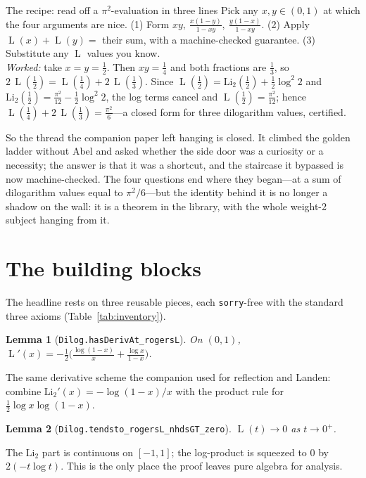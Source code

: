 \documentclass[11pt]{article}
\newtheorem{lemma}{Lemma}
\newcommand{\lean}[1]{\texttt{#1}}
\newcommand{\Li}{\mathrm{Li}_2}
\DeclareMathOperator{\Lrog}{L}
\begin{document}
\begin{recipebox}{The recipe: read off a $\pi^2$-evaluation in three lines}
Pick any $x,y\in(0,1)$ at which the four arguments are nice. (1) Form
$xy,\ \tfrac{x(1-y)}{1-xy},\ \tfrac{y(1-x)}{1-xy}$. (2) Apply
$\Lrog(x)+\Lrog(y)=$ their sum, with a machine-checked guarantee. (3) Substitute any
$\Lrog$ values you know.\\[3pt]
\emph{Worked:} take $x=y=\tfrac12$. Then $xy=\tfrac14$ and both fractions are $\tfrac13$,
so $2\,\Lrog(\tfrac12)=\Lrog(\tfrac14)+2\,\Lrog(\tfrac13)$. Since $\Lrog(\tfrac12)=
\Li(\tfrac12)+\tfrac12\log^2\!2$ and $\Li(\tfrac12)=\tfrac{\pi^2}{12}-\tfrac12\log^2\!2$,
the log terms cancel and $\Lrog(\tfrac12)=\tfrac{\pi^2}{12}$; hence
$\Lrog(\tfrac14)+2\,\Lrog(\tfrac13)=\tfrac{\pi^2}{6}$---a closed form for three dilogarithm
values, certified.
\end{recipebox}

So the thread the companion paper left hanging is closed. It climbed the golden ladder
without Abel and asked whether the side door was a curiosity or a necessity; the answer is
that it was a shortcut, and the staircase it bypassed is now machine-checked. The four
questions end where they began---at a sum of dilogarithm values equal to $\pi^2/6$---but the
identity behind it is no longer a shadow on the wall: it is a theorem in the library, with
the whole weight-2 subject hanging from it.

\section{The building blocks}\label{sec:blocks}

The headline rests on three reusable pieces, each \lean{sorry}-free with the standard three
axioms (Table~\ref{tab:inventory}).

\begin{lemma}[\lean{Dilog.hasDerivAt\_rogersL}]
On $(0,1)$, $\displaystyle\Lrog'(x)=-\tfrac12\Big(\tfrac{\log(1-x)}{x}+\tfrac{\log
x}{1-x}\Big)$.
\end{lemma}
The same derivative scheme the companion used for reflection and Landen: combine
$\Li'(x)=-\log(1-x)/x$ with the product rule for $\tfrac12\log x\log(1-x)$.

\begin{lemma}[\lean{Dilog.tendsto\_rogersL\_nhdsGT\_zero}]
$\Lrog(t)\to0$ as $t\to0^+$.
\end{lemma}
The $\Li$ part is continuous on $[-1,1]$; the log-product is squeezed to $0$ by
$2(-t\log t)$. This is the only place the proof leaves pure algebra for analysis.
\end{document}
